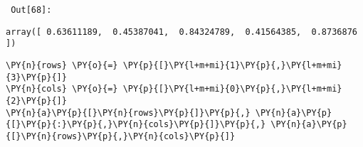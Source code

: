         {\par%
        \vspace{-1\smallerfontscale}%
        \noindent%
        \begin{minipage}{\cellleftmargin}%
    \hfill%
    {\smaller%
    \tt%
    \color{nbframe-out-prompt}%
    Out[68]:}%
    \hspace{\inputpadding}%
    \hspace{0em}%
    \hspace{3pt}%
    \end{minipage}%
        }%
    \begin{addmargin}[\cellleftmargin]{0em}%
    {\smaller%
    \vspace{-1\smallerfontscale}%
    
    
    
    \begin{verbatim}
array([ 0.63611189,  0.45387041,  0.84324789,  0.41564385,  0.8736876 ])
    \end{verbatim}

    
}%
    \end{addmargin}%

{\par%
\vspace{-1\baselineskip}%
}%
\begin{notebookcell}[69]%
\begin{addmargin}[\cellleftmargin]{0em}%
{\smaller%
\par%
%
\vspace{-1\smallerfontscale}%
\begin{Verbatim}[commandchars=\\\{\}]
\PY{n}{rows} \PY{o}{=} \PY{p}{[}\PY{l+m+mi}{1}\PY{p}{,}\PY{l+m+mi}{3}\PY{p}{]}
\PY{n}{cols} \PY{o}{=} \PY{p}{[}\PY{l+m+mi}{0}\PY{p}{,}\PY{l+m+mi}{2}\PY{p}{]}
\PY{n}{a}\PY{p}{[}\PY{n}{rows}\PY{p}{]}\PY{p}{,} \PY{n}{a}\PY{p}{[}\PY{p}{:}\PY{p}{,}\PY{n}{cols}\PY{p}{]}\PY{p}{,} \PY{n}{a}\PY{p}{[}\PY{n}{rows}\PY{p}{,}\PY{n}{cols}\PY{p}{]}
\end{Verbatim}
%
\par%
\vspace{-1\smallerfontscale}}%
\end{addmargin}
\end{notebookcell}

\par\vspace{1\smallerfontscale}%
    
